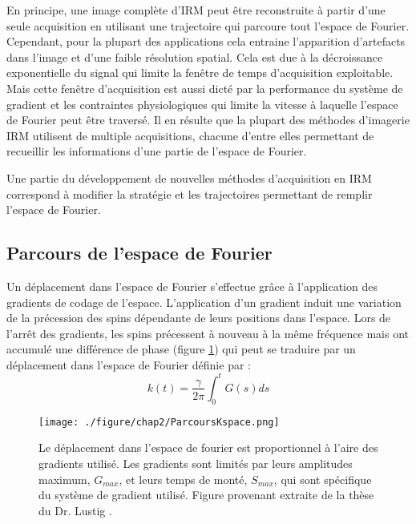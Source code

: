 En principe, une image complète d'IRM peut être reconstruite à partir d'une seule acquisition en utilisant une trajectoire qui  parcoure tout l'espace de Fourier. Cependant, pour la plupart des applications cela entraine l'apparition d'artefacts dans l'image et d'une faible résolution spatial. Cela est due à la décroissance exponentielle du signal qui limite la fenêtre de temps d'acquisition exploitable. Mais cette fenêtre d'acquisition est aussi dicté par la performance du système de gradient et les contraintes physiologiques qui limite la vitesse à laquelle l'espace de Fourier peut être traversé. Il en résulte que la plupart des méthodes d'imagerie IRM utilisent de multiple acquisitions, chacune d'entre elles permettant de recueillir les informations d'une partie de l'espace de Fourier.

Une partie du développement de nouvelles méthodes d'acquisition en IRM correspond à modifier la stratégie et les trajectoires permettant de remplir l'espace de Fourier.


\subsection{Parcours de l'espace de Fourier}
\label{subsec:Parcours}

Un déplacement dans l'espace de Fourier s'effectue grâce à l'application des gradients de codage de l'espace. L'application d'un gradient induit une variation de la précession des spins dépendante de leurs positions dans l'espace. Lors de l'arrêt des gradients, les spins précessent à nouveau à la même fréquence mais ont accumulé une différence de phase (figure \ref{fig:ParcoursKspace}) qui peut se traduire par un déplacement dans l'espace de Fourier définie par :
\begin{equation}
k(t)= \frac{\gamma}{2\pi} \int_0^t G(s)ds
\end{equation}

\begin{figure}[h]
\centering
\texttt{[image: ./figure/chap2/ParcoursKspace.png]}
\caption[Parcours de l'espace de Fourier]{\label{fig:ParcoursKspace} Le déplacement dans l'espace de fourier est proportionnel à l'aire des gradients utilisé. Les gradients sont limités par leurs amplitudes maximum, $G_{max}$, et leurs temps de monté, $S_{max}$, qui sont spécifique du système de gradient utilisé. Figure provenant extraite de la thèse du Dr. Lustig \cite{Lustig:2008ty}.}
\end{figure}

